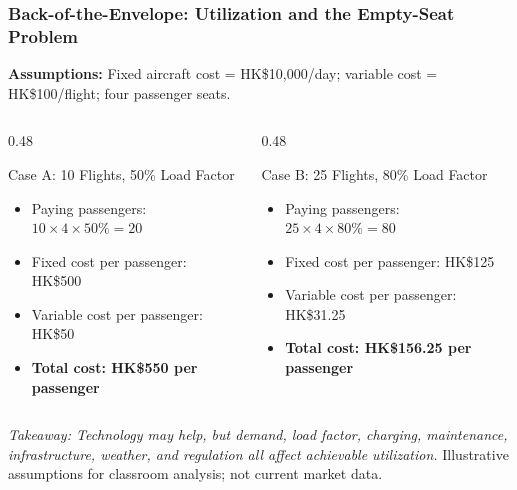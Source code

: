 \documentclass{beamer}
\begin{document}
\begin{frame}[t, shrink=15]
  \frametitle{Back-of-the-Envelope: Utilization and the Empty-Seat Problem}
  \textbf{Assumptions:} Fixed aircraft cost = HK\$10,000/day; variable cost = HK\$100/flight; four passenger seats.
  \begin{columns}[T]
    \begin{column}{0.48\textwidth}
      \begin{block}{Case A: 10 Flights, 50\% Load Factor}
      \begin{itemize}
        \item Paying passengers: \(10\times4\times50\%=20\)
        \item Fixed cost per passenger: HK\$500
        \item Variable cost per passenger: HK\$50
        \item \textbf{Total cost: HK\$550 per passenger}
      \end{itemize}
      \end{block}
    \end{column}
    \begin{column}{0.48\textwidth}
      \begin{block}{Case B: 25 Flights, 80\% Load Factor}
      \begin{itemize}
        \item Paying passengers: \(25\times4\times80\%=80\)
        \item Fixed cost per passenger: HK\$125
        \item Variable cost per passenger: HK\$31.25
        \item \textbf{Total cost: HK\$156.25 per passenger}
      \end{itemize}
      \end{block}
    \end{column}
  \end{columns}
  \textit{Takeaway: Technology may help, but demand, load factor, charging, maintenance, infrastructure, weather, and regulation all affect achievable utilization.}
  \vfill
  {\tiny Illustrative assumptions for classroom analysis; not current market data.}
\end{frame}
\end{document}
